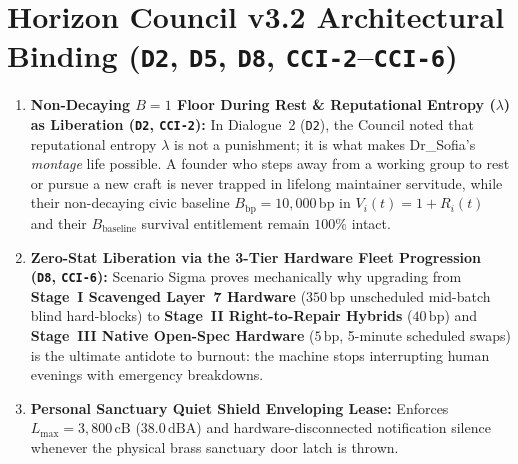 \section{Horizon Council v3.2 Architectural Binding (\texttt{D2}, \texttt{D5}, \texttt{D8}, \texttt{CCI-2}--\texttt{CCI-6})}
\begin{enumerate}
    \item \textbf{Non-Decaying $B = 1$ Floor During Rest \& Reputational Entropy ($\lambda$) as Liberation (\texttt{D2}, \texttt{CCI-2}):} In Dialogue~2 (\texttt{D2}), the Council noted that reputational entropy $\lambda$ is not a punishment; it is what makes Dr\_Sofia's \textit{montage} life possible. A founder who steps away from a working group to rest or pursue a new craft is never trapped in lifelong maintainer servitude, while their non-decaying civic baseline $B_{\mathrm{bp}} = 10{,}000\,\mathrm{bp}$ in $V_i(t) = 1 + R_i(t)$ and their $B_{\mathrm{baseline}}$ survival entitlement remain $100\%$ intact.
    \item \textbf{Zero-Stat Liberation via the 3-Tier Hardware Fleet Progression (\texttt{D8}, \texttt{CCI-6}):} Scenario Sigma proves mechanically why upgrading from \textbf{Stage~I Scavenged Layer~7 Hardware} ($350\,\mathrm{bp}$ unscheduled mid-batch blind hard-blocks) to \textbf{Stage~II Right-to-Repair Hybrids} ($40\,\mathrm{bp}$) and \textbf{Stage~III Native Open-Spec Hardware} ($5\,\mathrm{bp}$, 5-minute scheduled swaps) is the ultimate antidote to burnout: the machine stops interrupting human evenings with emergency breakdowns.
    \item \textbf{Personal Sanctuary Quiet Shield Enveloping Lease:} Enforces $L_{\max} = 3{,}800\,\mathrm{cB}$ ($38.0\,\mathrm{dBA}$) and hardware-disconnected notification silence whenever the physical brass sanctuary door latch is thrown.
\end{enumerate}

